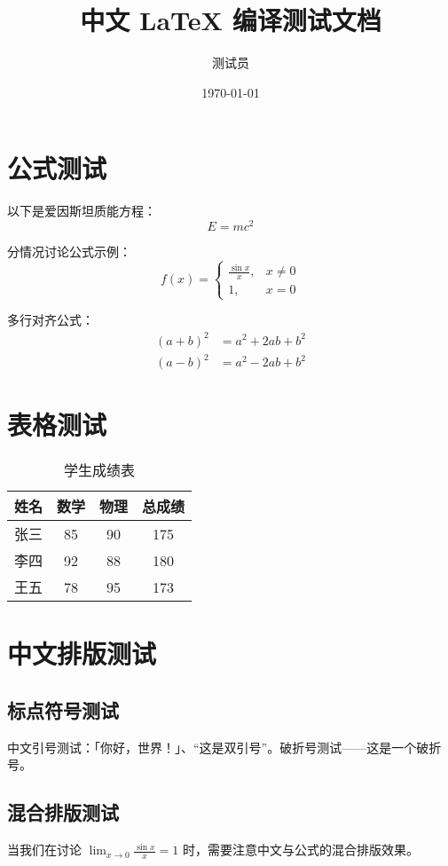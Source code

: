 \documentclass[UTF8]{ctexart}
\begin{document}
\title{中文 LaTeX 编译测试文档}
\author{测试员}
\date{\today}
\maketitle

\section{公式测试}

以下是爱因斯坦质能方程：
\begin{equation}
E = mc^2
\end{equation}

分情况讨论公式示例：
$$
f(x) = 
\begin{cases}
\frac{\sin x}{x}, & x \neq 0 \\
1,              & x = 0
\end{cases}
$$

多行对齐公式：
\begin{align}
(a + b)^2 &= a^2 + 2ab + b^2 \label{eq1} \\
(a - b)^2 &= a^2 - 2ab + b^2 \label{eq2}
\end{align}

\section{表格测试}

\begin{table}[htbp]
\centering
\caption{学生成绩表}
\begin{tabular}{cccc}
\toprule
姓名   & 数学 & 物理 & 总成绩 \\
\midrule
张三 & 85  & 90  & 175   \\
李四 & 92  & 88  & 180   \\
王五 & 78  & 95  & 173   \\
\bottomrule
\end{tabular}
\end{table}

\section{中文排版测试}

\subsection{标点符号测试}
中文引号测试：「你好，世界！」、“这是双引号”。破折号测试——这是一个破折号。

\subsection{混合排版测试}
当我们在讨论 $\lim_{x \to 0} \frac{\sin x}{x} = 1$ 时，需要注意中文与公式的混合排版效果。
\end{document}
